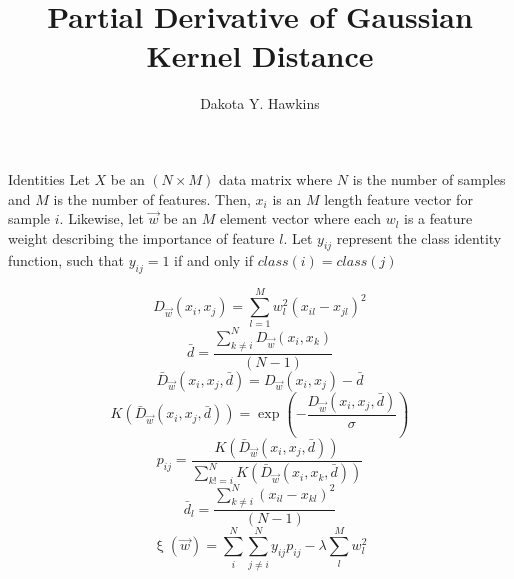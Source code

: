 \documentclass[12pt, a4paper]{article}
\title{Partial Derivative of Gaussian Kernel Distance}
\author{Dakota Y. Hawkins}
\begin{document}
\maketitle


\begin{section}{Identities}
    Let $X$ be an $(N \times M)$ data matrix where $N$ is the number of samples
    and $M$ is the number of features. Then, $x_i$ is an $M$ length feature
    vector for sample $i$. Likewise, let $\vec w$ be an $M$ element vector where
    each $w_l$ is a feature weight describing the importance of feature $l$. Let
    $y_{ij}$ represent the class identity function, such that $y_{ij} = 1$ if
    and only if $class(i) = class(j)$

    \begin{equation} \label{D}
        D_{\vec w}(x_i, x_j) = \sum \limits_{l = 1}^M w_l^2
                               \left ( x_{il} - x_{jl} \right )^2
    \end{equation}
    \begin{equation} \label{d.avg}
        \bar d = \dfrac{\sum \limits_{k \neq i}^N D_{\vec w}(x_i, x_k)}{(N - 1)}
    \end{equation}
    \begin{equation} \label{D.bar}
    \bar D_{\vec w}(x_i, x_j, \bar d) = D_{\vec w}(x_i, x_j) - \bar d
    \end{equation}
    \begin{equation} \label{k.dist}
        K(\bar D_{\vec w}(x_i, x_j, \bar d)) = \exp{\left ( -  \dfrac
                                                  {D_{\vec w}(x_i, x_j, \bar d)}
                                                  {\sigma} \right )}
    \end{equation}
    \begin{equation} \label{pij}
        p_{ij} = \dfrac{K(\bar D_{\vec w}(x_i, x_j, \bar d))}{\sum
                 \limits_{k != i}^N K(\bar D_{\vec w}(x_i, x_k, \bar d))}
    \end{equation}
    \begin{equation} \label{d_l}
        \bar d_l = \dfrac{\sum \limits_{k \neq i}^N (x_{il} - x_{kl})^2}
                         {(N - 1)} 
    \end{equation}
    \begin{equation} \label{obj}
        \upxi(\vec w) = \sum \limits_i^N \sum \limits_{j \neq i}^N y_{ij} p_{ij}
                         - \lambda \sum \limits_l^M w_l^2
    \end{equation}


\end{section}
\end{document}
